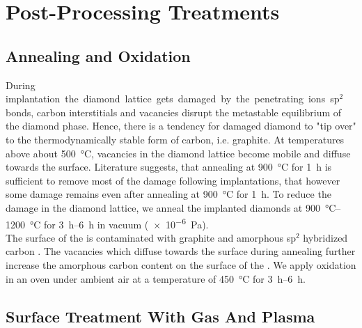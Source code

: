 	\section{Post-Processing Treatments}

		\subsection{Annealing and Oxidation}\label{sec::ann_ox}

		During \si implantation the diamond lattice gets damaged by the penetrating ions.
		sp$^2$ bonds, carbon interstitials and vacancies disrupt the metastable equilibrium of the diamond phase. Hence, there is a tendency for damaged diamond to "tip over" to the thermodynamically stable form of carbon, i.e. graphite.
		At temperatures above about \SI{500}{\celsius}, vacancies in the diamond lattice become mobile and diffuse towards the surface\cite{Dresselhaus1992}.
		Literature suggests, that annealing at \SI{900}{\celsius} for \SI{1}{\hour} is sufficient to remove most of the damage following implantations, that however some damage remains even after annealing at \SI{900}{\celsius} for \SI{1}{\hour}.
		To reduce the damage in the diamond lattice, we anneal the implanted diamonds at \SIrange{900}{1200}{\celsius} for \SIrange{3}{6}{h} in vacuum (\SI{e-6}{Pa}).
		\\
		The surface of the \nds is contaminated with graphite and amorphous sp$^2$ hybridized carbon .
		The vacancies which diffuse towards the surface during annealing further increase the amorphous carbon content on the surface of the \nds \cite{}.
		We apply oxidation in an oven under ambient air at a temperature of \SI{450}{\celsius} for \SIrange{3}{6}{h}.

		\subsection{Surface Treatment With Gas And Plasma}

